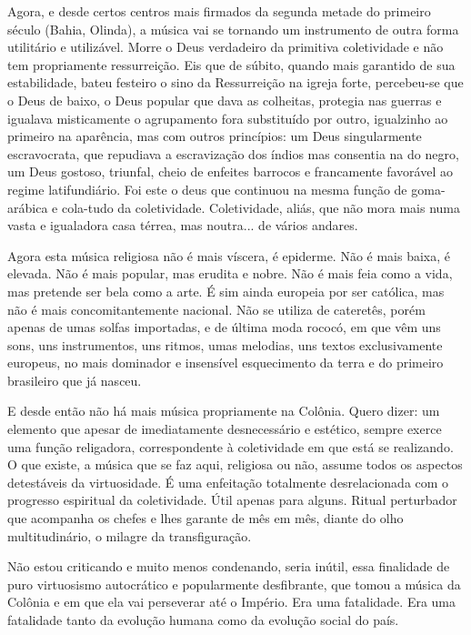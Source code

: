 Agora, e desde certos centros mais firmados da segunda metade do
primeiro século (Bahia, Olinda), a música vai se tornando um instrumento
de outra forma utilitário e utilizável. Morre o Deus verdadeiro da
primitiva coletividade e não tem propriamente ressurreição. Eis que de
súbito, quando mais garantido de sua estabilidade, bateu festeiro o sino
da Ressurreição na igreja forte, percebeu-se que o Deus de baixo, o Deus
popular que dava as colheitas, protegia nas guerras e igualava
misticamente o agrupamento fora substituído por outro, igualzinho ao
primeiro na aparência, mas com outros princípios: um Deus singularmente
escravocrata, que repudiava a escravização dos índios mas consentia na
do negro, um Deus gostoso, triunfal, cheio de enfeites barrocos e
francamente favorável ao regime latifundiário. Foi este o deus que
continuou na mesma função de goma-arábica e cola-tudo da coletividade.
Coletividade, aliás, que não mora mais numa vasta e igualadora casa
térrea, mas noutra... de vários andares.

Agora esta música religiosa não é mais víscera, é epiderme. Não é mais
baixa, é elevada. Não é mais popular, mas erudita e nobre. Não é mais
feia como a vida, mas pretende ser bela como a arte. É sim ainda
europeia por ser católica, mas não é mais concomitantemente nacional.
Não se utiliza de cateretês, porém apenas de umas solfas importadas, e
de última moda rococó, em que vêm uns sons, uns instrumentos, uns
ritmos, umas melodias, uns textos exclusivamente europeus, no mais
dominador e insensível esquecimento da terra e do primeiro brasileiro
que já nasceu.

E desde então não há mais música propriamente na Colônia. Quero dizer:
um elemento que apesar de imediatamente desnecessário e estético, sempre
exerce uma função religadora, correspondente à coletividade em que está
se realizando. O que existe, a música que se faz aqui, religiosa ou não,
assume todos os aspectos detestáveis da virtuosidade. É uma enfeitação
totalmente desrelacionada com o progresso espiritual da coletividade.
Útil apenas para alguns. Ritual perturbador que acompanha os chefes e
lhes garante de mês em mês, diante do olho multitudinário, o milagre da
transfiguração.

Não estou criticando e muito menos condenando, seria inútil, essa
finalidade de puro virtuosismo autocrático e popularmente desfibrante,
que tomou a música da Colônia e em que ela vai perseverar até o Império.
Era uma fatalidade. Era uma fatalidade tanto da evolução humana como da
evolução social do país.

